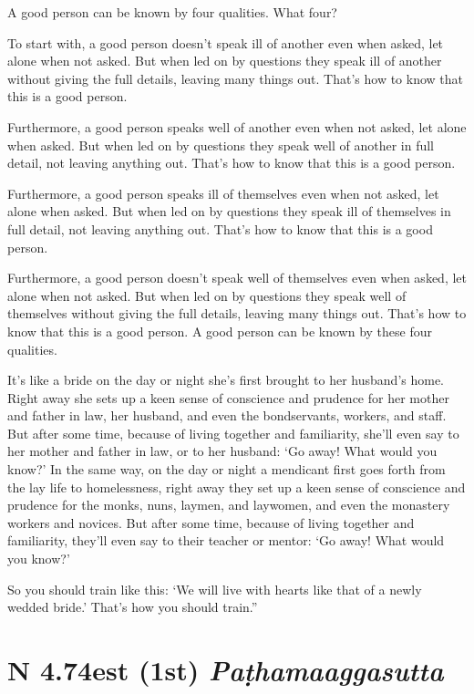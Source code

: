 \documentclass[12pt,openany]{book}%
\newcommand*{\suttatitleacronym}[1]{\smaller[2]{#1}\vspace*{.3em}}
\newcommand*{\suttatitletranslation}[1]{\linebreak{#1}}
\newcommand*{\suttatitleroot}[1]{\linebreak\smaller[2]\itshape{#1}}
\newcommand*{\tocacronym}[1]{\hspace*{-3.3em}{#1}\quad}
\newcommand*{\toctranslation}[1]{#1}
\newcommand*{\tocroot}[1]{(\textit{#1})}
\begin{document}
A good person can be known by four qualities. What four? 

To start with, a good person doesn’t speak ill of another even when asked, let alone when not asked. But when led on by questions they speak ill of another without giving the full details, leaving many things out. That’s how to know that this is a good person. 

Furthermore, a good person speaks well of another even when not asked, let alone when asked. But when led on by questions they speak well of another in full detail, not leaving anything out. That’s how to know that this is a good person. 

Furthermore, a good person speaks ill of themselves even when not asked, let alone when asked. But when led on by questions they speak ill of themselves in full detail, not leaving anything out. That’s how to know that this is a good person. 

Furthermore, a good person doesn’t speak well of themselves even when asked, let alone when not asked. But when led on by questions they speak well of themselves without giving the full details, leaving many things out. That’s how to know that this is a good person. A good person can be known by these four qualities. 

It’s like a bride on the day or night she’s first brought to her husband’s home. Right away she sets up a keen sense of conscience and prudence for her mother and father in law, her husband, and even the bondservants, workers, and staff. But after some time, because of living together and familiarity, she’ll even say to her mother and father in law, or to her husband: ‘Go away! What would you know?’ In the same way, on the day or night a mendicant first goes forth from the lay life to homelessness, right away they set up a keen sense of conscience and prudence for the monks, nuns, laymen, and laywomen, and even the monastery workers and novices. But after some time, because of living together and familiarity, they’ll even say to their teacher or mentor: ‘Go away! What would you know?’ 

So you should train like this: ‘We will live with hearts like that of a newly wedded bride.’ That’s how you should train.” 

%
\section*{{\suttatitleacronym AN 4.74}{\suttatitletranslation Best (1st) }{\suttatitleroot Paṭhamaaggasutta}}
\addcontentsline{toc}{section}{\tocacronym{AN 4.74} \toctranslation{Best (1st) } \tocroot{Paṭhamaaggasutta}}
\end{document}
